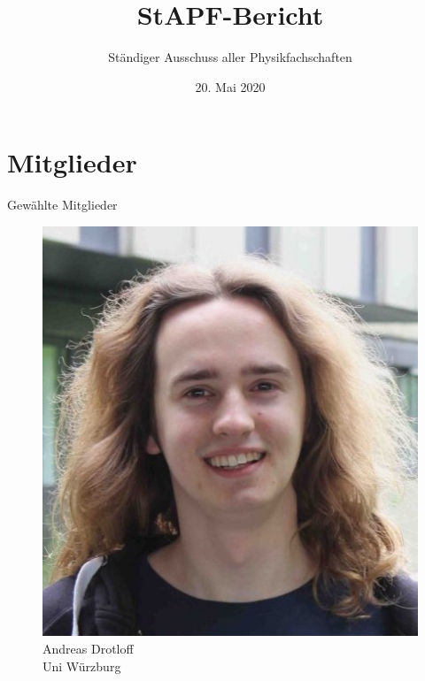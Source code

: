 \documentclass[compress, aspectratio=169]{beamer}
\title[StAPf-Bericht]{StAPF-Bericht}
\author{Ständiger Ausschuss aller Physikfachschaften}
\institute[Zusammenkunft aller Physikfachschaften]
\date{20. Mai 2020}
\begin{document}
\begin{frame}[plain]{}
  \titlepage
\end{frame}

\section{Mitglieder}

\begin{frame}{Gewählte Mitglieder}
  \begin{minipage}{.28\textwidth}
    \begin{figure}
      \begin{minipage}[c]{.57\textwidth}
        \includegraphics[height=0.3\textheight]{andy.jpg}
      \end{minipage} \hfill
      \begin{minipage}[c]{.4\textwidth}
        \caption*{Andreas Drotloff\\Uni Würzburg}
      \end{minipage}
    \end{figure}
  \end{minipage}
\hfill
  \begin{minipage}{.28\textwidth}
    \begin{figure}
      \begin{minipage}[c]{.5\textwidth}

\end{minipage}
\end{figure}
\end{minipage}
\end{frame}
\end{document}
